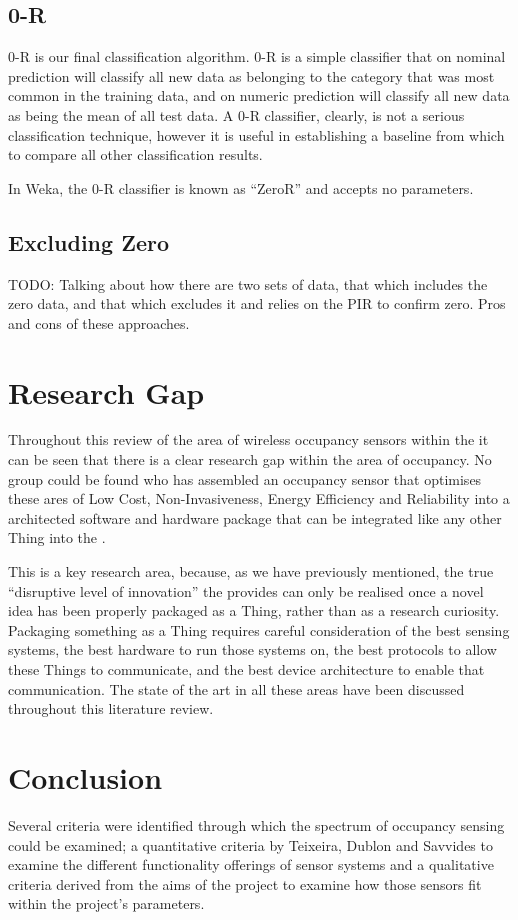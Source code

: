 \documentclass[../thesis/thesis.tex]{subfiles}
\begin{document}
\subsection{0-R}
0-R is our final classification algorithm. 0-R is a simple classifier that on nominal prediction will classify all new data as belonging to the category that was most common in the training data, and on numeric prediction will classify all new data as being the mean of all test data. A 0-R classifier, clearly, is not a serious classification technique, however it is useful in establishing a baseline from which to compare all other classification results.

In Weka, the 0-R classifier is known as ``ZeroR'' and accepts no parameters.

\subsection{Excluding Zero}
TODO: Talking about how there are two sets of data, that which includes the zero data, and that which excludes it and relies on the PIR to confirm zero. Pros and cons of these approaches.

\section{Research Gap}
\label{sec:litreview:discussion}
Throughout this review of the area of wireless occupancy sensors within the \iot it can be seen that there is a clear research gap within the area of occupancy. No group could be found who has assembled an occupancy sensor that optimises these ares of Low Cost, Non-Invasiveness, Energy Efficiency and Reliability into a architected software and hardware package that can be integrated like any other Thing into the \iot.

This is a key research area, because, as we have previously mentioned, the true ``disruptive level of innovation''\cite{atzori2010internet} the \iot provides can only be realised once a novel idea has been properly packaged as a Thing, rather than as a research curiosity. Packaging something as a Thing requires careful consideration of the best sensing systems, the best hardware to run those systems on, the best protocols to allow these Things to communicate, and the best device architecture to enable that communication. The state of the art in all these areas have been discussed throughout this literature review.

\section{Conclusion}
\label{sec:litreview:conclusion}
Several criteria were identified through which the spectrum of occupancy sensing could be examined; a quantitative criteria by Teixeira, Dublon and Savvides \cite{teixeira2010survey} to examine the different functionality offerings of sensor systems and a qualitative criteria derived from the aims of the project to examine how those sensors fit within the project's parameters.
\end{document}
